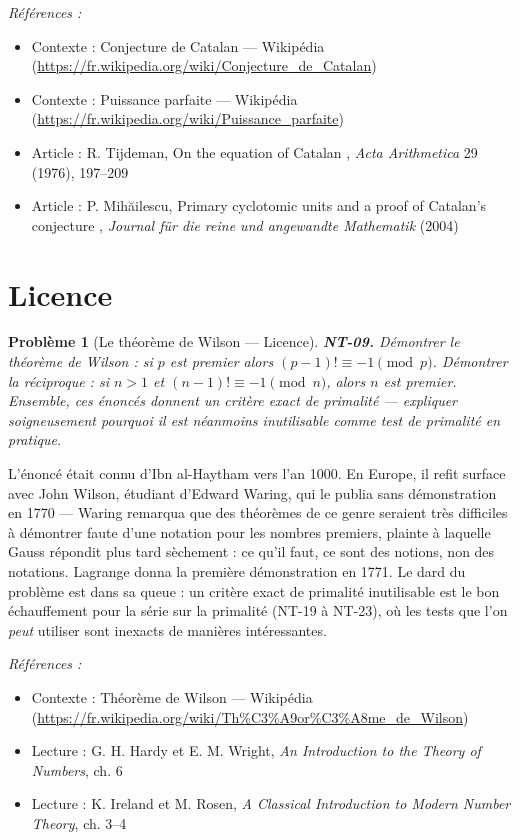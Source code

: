 \documentclass[11pt]{article}
\newtheorem{problem}{Problème}
\newenvironment{refs}{\par\small\noindent\emph{Références :}\begin{itemize}\setlength\itemsep{0pt}}{\end{itemize}\normalsize}
\begin{document}
\begin{refs}
\item Contexte : Conjecture de Catalan --- Wikipédia (\url{https://fr.wikipedia.org/wiki/Conjecture_de_Catalan})
\item Contexte : Puissance parfaite --- Wikipédia (\url{https://fr.wikipedia.org/wiki/Puissance_parfaite})
\item Article : R. Tijdeman, \og{} On the equation of Catalan \fg{}, \textit{Acta Arithmetica} 29 (1976), 197--209
\item Article : P. Mih\u{a}ilescu, \og{} Primary cyclotomic units and a proof of Catalan's conjecture \fg{}, \textit{Journal für die reine und angewandte Mathematik} (2004)
\end{refs}

\bigskip


\section*{Licence}

\begin{problem}[{Le théorème de Wilson --- Licence}]
\textbf{NT-09.} Démontrer le théorème de Wilson : si $p$ est premier alors
$(p - 1)! \equiv -1 \pmod p$. Démontrer la réciproque : si $n > 1$ et
$(n - 1)! \equiv -1 \pmod n$, alors $n$ est premier. Ensemble, ces énoncés donnent un critère
exact de primalité --- expliquer soigneusement pourquoi il est néanmoins inutilisable comme test de
primalité en pratique.
\end{problem}

\noindent L'énoncé était connu d'Ibn al-Haytham vers l'an 1000. En Europe, il refit
surface avec John Wilson, étudiant d'Edward Waring, qui le publia sans démonstration en 1770 ---
Waring remarqua que des théorèmes de ce genre seraient très difficiles à démontrer faute d'une
notation pour les nombres premiers, plainte à laquelle Gauss répondit plus tard sèchement : ce qu'il
faut, ce sont des notions, non des notations. Lagrange donna la première démonstration en 1771. Le
dard du problème est dans sa queue : un critère exact de primalité inutilisable est le bon
échauffement pour la série sur la primalité (NT-19 à NT-23), où les tests que l'on \textit{peut}
utiliser sont inexacts de manières intéressantes.

\begin{refs}
\item Contexte : Théorème de Wilson --- Wikipédia (\url{https://fr.wikipedia.org/wiki/Th%C3%A9or%C3%A8me_de_Wilson})
\item Lecture : G. H. Hardy et E. M. Wright, \textit{An Introduction to the Theory of Numbers}, ch. 6
\item Lecture : K. Ireland et M. Rosen, \textit{A Classical Introduction to Modern Number Theory}, ch. 3--4
\end{refs}
\end{document}
